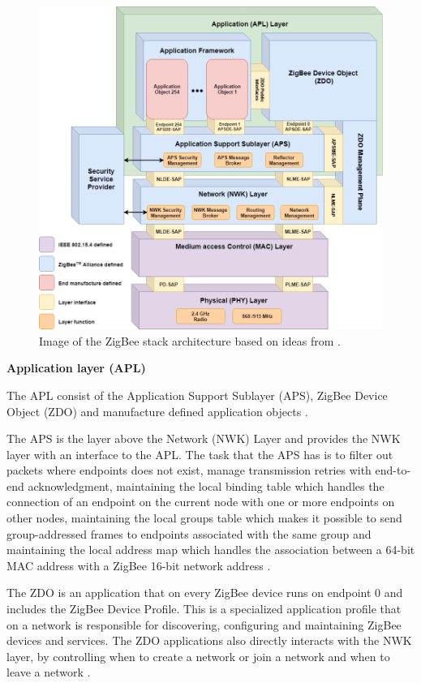 \begin{figure}[ht]
\centering
\includegraphics[scale=0.46]{figure/ZigBeeStackArchitecture.png}
\caption{Image of the ZigBee stack architecture based on ideas from \citet{gislason2008zigbee, yang2014internet, zigbee2007spec}.}
\label{fig:zigBeeArch}
\end{figure}

\vspace{5mm}
\textbf{Application layer (APL)}

The APL consist of the Application Support Sublayer (APS), ZigBee Device Object (ZDO) and manufacture defined application objects \citep{zigbee2007spec}.

The APS is the layer above the Network (NWK) Layer and provides the NWK layer with an interface to the APL.  The task that the APS has is to filter out packets where endpoints does not exist, manage transmission retries with end-to-end acknowledgment, maintaining the local binding table which handles the connection of an endpoint on the current node with one or more endpoints on other nodes, maintaining the local groups table which makes it possible to send group-addressed frames to endpoints associated with the same group and maintaining the local address map which handles the association between a 64-bit MAC address with a ZigBee 16-bit network address \citep{gislason2008zigbee, zigbee2007spec}.

The ZDO is an application that on every ZigBee device runs on endpoint 0 and includes the ZigBee Device Profile. This is a specialized application profile that on a network is responsible for discovering, configuring and maintaining ZigBee devices and services.  The ZDO applications also directly interacts with the NWK layer, by controlling when to create a network or join a network and when to leave a network \citep{gislason2008zigbee}.

